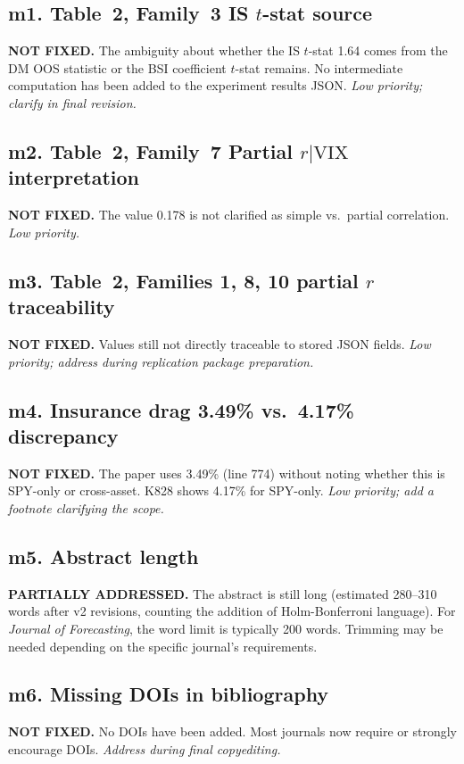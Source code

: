 \documentclass[12pt,a4paper]{article}
\begin{document}
\subsection*{m1. Table~2, Family~3 IS $t$-stat source}
\textbf{NOT FIXED.} The ambiguity about whether the IS $t$-stat 1.64 comes from the DM OOS statistic or the BSI coefficient $t$-stat remains. No intermediate computation has been added to the experiment results JSON. \textit{Low priority; clarify in final revision.}

\subsection*{m2. Table~2, Family~7 Partial $r|\text{VIX}$ interpretation}
\textbf{NOT FIXED.} The value 0.178 is not clarified as simple vs.\ partial correlation. \textit{Low priority.}

\subsection*{m3. Table~2, Families 1, 8, 10 partial $r$ traceability}
\textbf{NOT FIXED.} Values still not directly traceable to stored JSON fields. \textit{Low priority; address during replication package preparation.}

\subsection*{m4. Insurance drag 3.49\% vs.\ 4.17\% discrepancy}
\textbf{NOT FIXED.} The paper uses 3.49\% (line 774) without noting whether this is SPY-only or cross-asset. K828 shows 4.17\% for SPY-only. \textit{Low priority; add a footnote clarifying the scope.}

\subsection*{m5. Abstract length}
\textcolor{fixedblue}{\textbf{PARTIALLY ADDRESSED.}} The abstract is still long (estimated 280--310 words after v2 revisions, counting the addition of Holm-Bonferroni language). For \textit{Journal of Forecasting}, the word limit is typically 200 words. Trimming may be needed depending on the specific journal's requirements.

\subsection*{m6. Missing DOIs in bibliography}
\textbf{NOT FIXED.} No DOIs have been added. Most journals now require or strongly encourage DOIs. \textit{Address during final copyediting.}
\end{document}
